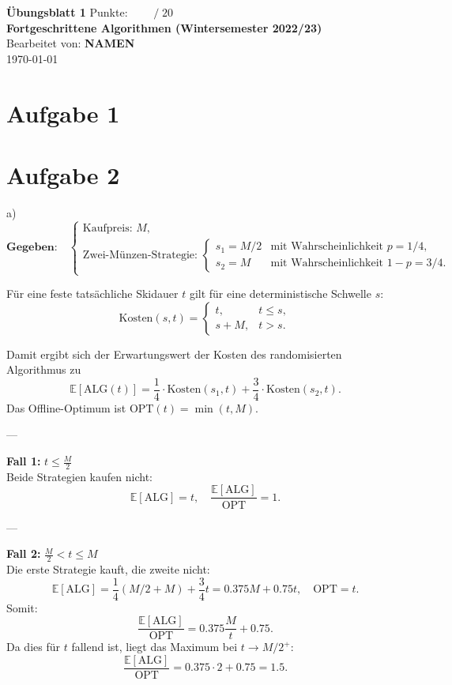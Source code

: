 \documentclass[a4paper]{scrartcl}
\def\to{\ensuremath{\rightarrow}} %
\def\sheetNumber{1}
\def\names{NAMEN}
\def\sumPoints{20}
\begin{document}
 

\begin{doublespace} %
\noindent \textbf{\LARGE{Übungsblatt \sheetNumber}}
\hfill  {\large Punkte: $\boxed{\qquad  /\; \sumPoints}$}\\
{\Large \textbf{Fortgeschrittene Algorithmen (Wintersemester 2022/23)}\\
Bearbeitet von: \textbf{\names}\\
\today}
\end{doublespace}


\section*{Aufgabe 1}

\section*{Aufgabe 2}
    a)
\[
\textbf{Gegeben:} \quad
\begin{cases}
\text{Kaufpreis: } M,\\[4pt]
\text{Zwei-Münzen-Strategie: }
\begin{cases}
s_1 = M/2 & \text{mit Wahrscheinlichkeit } p = 1/4,\\
s_2 = M   & \text{mit Wahrscheinlichkeit } 1 - p = 3/4.
\end{cases}
\end{cases}
\]

Für eine feste tatsächliche Skidauer \(t\) gilt für eine deterministische Schwelle \(s\):
\[
\text{Kosten}(s,t) =
\begin{cases}
t, & t \le s,\\
s + M, & t > s.
\end{cases}
\]

Damit ergibt sich der Erwartungswert der Kosten des randomisierten Algorithmus zu
\[
\mathbb{E}[\text{ALG}(t)] =
\frac{1}{4} \cdot \text{Kosten}(s_1,t) +
\frac{3}{4} \cdot \text{Kosten}(s_2,t).
\]
Das Offline-Optimum ist \(\text{OPT}(t) = \min(t, M)\).

---

\textbf{Fall 1:} \(t \le \frac{M}{2}\) \\
Beide Strategien kaufen nicht:
\[
\mathbb{E}[\text{ALG}] = t, \quad
\frac{\mathbb{E}[\text{ALG}]}{\text{OPT}} = 1.
\]

---

\textbf{Fall 2:} \(\frac{M}{2} < t \le M\) \\
Die erste Strategie kauft, die zweite nicht:
\[
\mathbb{E}[\text{ALG}] =
\frac{1}{4}(M/2 + M) + \frac{3}{4}t
= 0.375M + 0.75t,
\quad \text{OPT} = t.
\]
Somit:
\[
\frac{\mathbb{E}[\text{ALG}]}{\text{OPT}}
= 0.375 \frac{M}{t} + 0.75.
\]
Da dies für \(t\) fallend ist, liegt das Maximum bei \(t \to M/2^+\):
\[
\frac{\mathbb{E}[\text{ALG}]}{\text{OPT}}
= 0.375 \cdot 2 + 0.75 = 1.5.
\]
\end{document}
